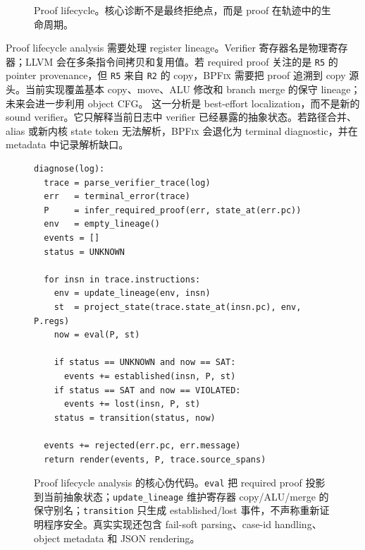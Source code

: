 \documentclass[letterpaper,twocolumn,10pt]{article}
\newcommand{\sys}{\textsc{BPFix}\xspace}
\newcommand{\code}[1]{\texttt{#1}}
\begin{document}
\begin{figure}[t]
\centering
{}
\caption{Proof lifecycle。核心诊断不是最终拒绝点，而是 proof 在轨迹中的生命周期。}
\label{fig:lifecycle}
\end{figure}

Proof lifecycle analysis 需要处理 register lineage。Verifier 寄存器名是物理寄存器；LLVM 会在多条指令间拷贝和复用值。若 required proof 关注的是 \code{R5} 的 pointer provenance，但 \code{R5} 来自 \code{R2} 的 copy，\sys 需要把 proof 追溯到 copy 源头。当前实现覆盖基本 copy、move、ALU 修改和 branch merge 的保守 lineage；未来会进一步利用 object CFG。
这一分析是 best-effort localization，而不是新的 sound verifier。它只解释当前日志中 verifier 已经暴露的抽象状态。若路径合并、alias 或新内核 state token 无法解析，\sys 会退化为 terminal diagnostic，并在 metadata 中记录解析缺口。

\begin{figure}[t]
\begin{lstlisting}[style=tinycode]
diagnose(log):
  trace = parse_verifier_trace(log)
  err   = terminal_error(trace)
  P     = infer_required_proof(err, state_at(err.pc))
  env   = empty_lineage()
  events = []
  status = UNKNOWN

  for insn in trace.instructions:
    env = update_lineage(env, insn)
    st  = project_state(trace.state_at(insn.pc), env, P.regs)
    now = eval(P, st)

    if status == UNKNOWN and now == SAT:
      events += established(insn, P, st)
    if status == SAT and now == VIOLATED:
      events += lost(insn, P, st)
    status = transition(status, now)

  events += rejected(err.pc, err.message)
  return render(events, P, trace.source_spans)
\end{lstlisting}
\caption{Proof lifecycle analysis 的核心伪代码。\code{eval} 把 required proof 投影到当前抽象状态；\code{update\_lineage} 维护寄存器 copy/ALU/merge 的保守别名；\code{transition} 只生成 established/lost 事件，不声称重新证明程序安全。真实实现还包含 fail-soft parsing、case-id handling、object metadata 和 JSON rendering。}
\label{fig:algorithm}
\end{figure}
\end{document}
